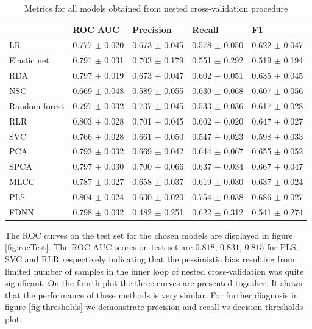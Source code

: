 \documentclass[shortabstract, english, mgr]{iithesis}
\begin{document}
\begin{table}
\centering
\begin{tabular}{lllll}
\toprule
{} &            ROC AUC &          Precision &             Recall &                 F1 \\
\midrule
LR                                &  0.777 $\pm$ 0.020 &  0.673 $\pm$ 0.045 &  0.578 $\pm$ 0.050 &  0.622 $\pm$ 0.047 \\
Elastic net                       &  0.791 $\pm$ 0.031 &  0.703 $\pm$ 0.179 &  0.551 $\pm$ 0.292 &  0.519 $\pm$ 0.194 \\
RDA                               &  0.797 $\pm$ 0.019 &  0.673 $\pm$ 0.047 &  0.602 $\pm$ 0.051 &  0.635 $\pm$ 0.045 \\
NSC                               &  0.669 $\pm$ 0.048 &  0.589 $\pm$ 0.055 &  0.630 $\pm$ 0.068 &  0.607 $\pm$ 0.056 \\
Random forest                     &  0.797 $\pm$ 0.032 &  0.737 $\pm$ 0.045 &  0.533 $\pm$ 0.036 &  0.617 $\pm$ 0.028 \\
RLR                               &  0.803 $\pm$ 0.028 &  0.701 $\pm$ 0.045 &  0.602 $\pm$ 0.020 &  0.647 $\pm$ 0.027 \\
SVC                               &  0.766 $\pm$ 0.028 &  0.661 $\pm$ 0.050 &  0.547 $\pm$ 0.023 &  0.598 $\pm$ 0.033 \\
PCA                               &  0.793 $\pm$ 0.032 &  0.669 $\pm$ 0.042 &  0.644 $\pm$ 0.067 &  0.655 $\pm$ 0.052 \\
SPCA                              &  0.797 $\pm$ 0.030 &  0.700 $\pm$ 0.066 &  0.637 $\pm$ 0.034 &  0.667 $\pm$ 0.047 \\
MLCC                              &  0.787 $\pm$ 0.027 &  0.658 $\pm$ 0.037 &  0.619 $\pm$ 0.030 &  0.637 $\pm$ 0.024 \\
PLS                               &  0.804 $\pm$ 0.024 &  0.630 $\pm$ 0.020 &  0.754 $\pm$ 0.038 &  0.686 $\pm$ 0.027 \\
FDNN                              &  0.798 $\pm$ 0.032 &  0.482 $\pm$ 0.251 &  0.622 $\pm$ 0.312 &  0.541 $\pm$ 0.274 \\

\bottomrule
\end{tabular}
\caption{Metrics for all models obtained from nested cross-validation procedure}
    \label{tab:ncv-metrics}
\end{table}

The ROC curves on the test set for the chosen models are displayed in figure \ref{fig:rocTest}. The ROC AUC scores on test set are $0.818$, $0.831$, $0.815$ for PLS, SVC and RLR respectively indicating that the pessimistic bias resulting from limited number of samples in the inner loop of nested cross-validation was quite significant. On the fourth plot the three curves are presented together. It shows that the performance of these methods is very similar. For further diagnosis in figure \ref{fig:thresholds} we demonstrate precision and recall vs decision thresholds plot.
\end{document}
